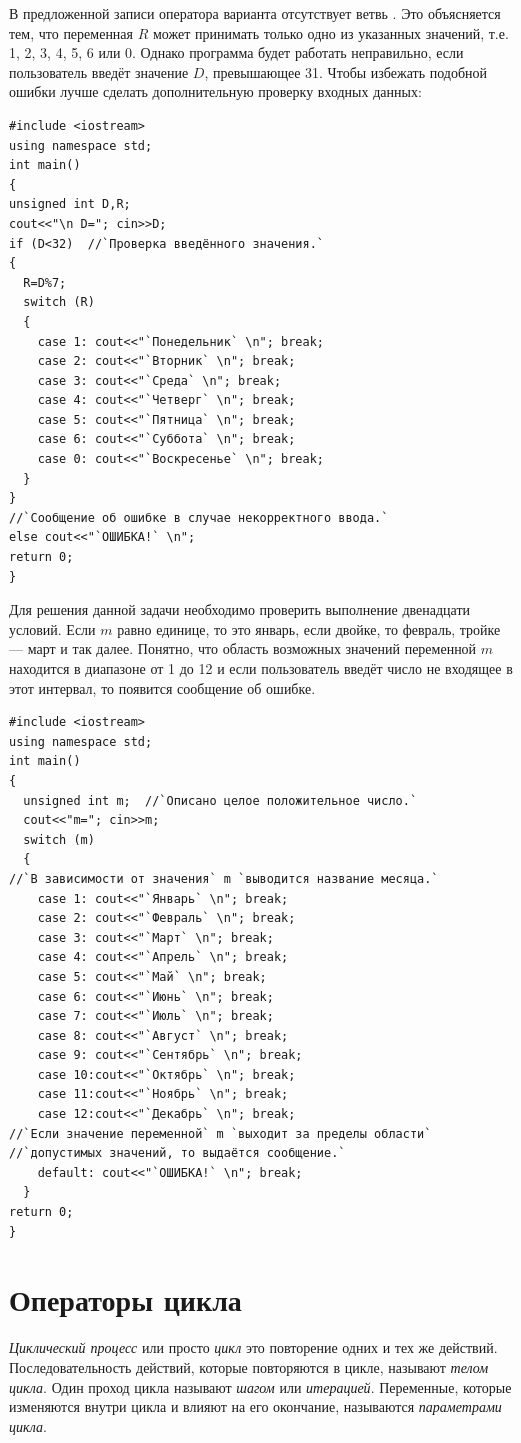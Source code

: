 В предложенной записи оператора варианта отсутствует ветвь . Это объясняется тем, что
переменная $R$ может принимать только одно из указанных значений, т.е. 1, 2, 3, 4, 5, 6 или 0. Однако
программа будет работать неправильно, если пользователь введёт значение $D$, превышающее 31. Чтобы
избежать подобной ошибки лучше сделать дополнительную проверку входных данных:
\begin{lstlisting}
#include <iostream>
using namespace std;
int main()
{
unsigned int D,R;
cout<<"\n D="; cin>>D;
if (D<32)  //`Проверка введённого значения.`
{
  R=D%7;
  switch (R)
  {
    case 1: cout<<"`Понедельник` \n"; break;
    case 2: cout<<"`Вторник` \n"; break;
    case 3: cout<<"`Среда` \n"; break;
    case 4: cout<<"`Четверг` \n"; break;
    case 5: cout<<"`Пятница` \n"; break;
    case 6: cout<<"`Суббота` \n"; break;
    case 0: cout<<"`Воскресенье` \n"; break;
  }
}
//`Сообщение об ошибке в случае некорректного ввода.`
else cout<<"`ОШИБКА!` \n";
return 0;
}
\end{lstlisting}


Для решения данной задачи необходимо проверить выполнение двенадцати условий. 
Если $m$ равно единице, то это январь, если двойке, то февраль, тройке --- март и так далее. 
Понятно, что область возможных значений переменной $m$
находится в диапазоне от 1 до 12 и если пользователь введёт число не входящее в этот интервал, то появится сообщение об
ошибке.
\begin{lstlisting}
#include <iostream>
using namespace std;
int main()
{
  unsigned int m;  //`Описано целое положительное число.`
  cout<<"m="; cin>>m;
  switch (m)
  {
//`В зависимости от значения` m `выводится название месяца.`
    case 1: cout<<"`Январь` \n"; break;
    case 2: cout<<"`Февраль` \n"; break;
    case 3: cout<<"`Март` \n"; break;
    case 4: cout<<"`Апрель` \n"; break;
    case 5: cout<<"`Май` \n"; break;
    case 6: cout<<"`Июнь` \n"; break;
    case 7: cout<<"`Июль` \n"; break;
    case 8: cout<<"`Август` \n"; break;
    case 9: cout<<"`Сентябрь` \n"; break;
    case 10:cout<<"`Октябрь` \n"; break;
    case 11:cout<<"`Ноябрь` \n"; break;
    case 12:cout<<"`Декабрь` \n"; break;
//`Если значение переменной` m `выходит за пределы области`
//`допустимых значений, то выдаётся сообщение.`
    default: cout<<"`ОШИБКА!` \n"; break;
  }
return 0;
}
\end{lstlisting}

\section[Операторы цикла]{Операторы цикла}
\emph{Циклический процесс} или просто
\emph{цикл}  это повторение одних и тех же действий. Последовательность
действий, которые повторяются в цикле, называют \emph{телом цикла}. Один проход цикла называют
\emph{шагом} или \emph{итерацией}. Переменные, которые изменяются внутри цикла и влияют на
его окончание, называются \emph{параметрами цикла}. 

